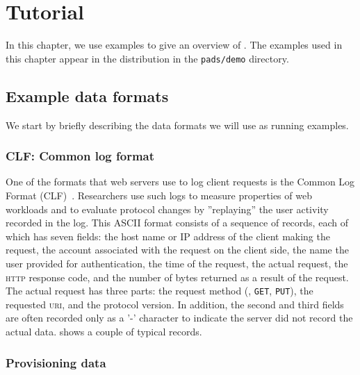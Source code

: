 \chapter{Tutorial}
\label{chap:example}
In this chapter, we use examples to give an overview of \pads{}.
The examples used in this chapter appear in the \pads{} distribution in the 
\texttt{pads/demo} directory.


\section{Example data formats}
We start by briefly describing the data formats we will use as running examples. 

\subsection{CLF: Common log format}
\label{sec:example:common-log-format}
One of the formats that web servers use to log client
requests is the Common Log Format (CLF)~\cite{wpp}.  Researchers use such logs to measure 
properties of web workloads and to evaluate protocol changes
by ''replaying'' the user activity recorded in the log.
This ASCII format consists of a sequence of
records, each of which has seven fields: the host name or IP address
of the client making the request, the account associated with the
request on the client side, the name the user provided for
authentication, the time of the request, the actual request, the
\textsc{http} response code, and the number of bytes returned as a
result of the request.  The actual request has three parts: the
request method (\eg, \texttt{GET}, \texttt{PUT}), the requested
\textsc{uri}, and the protocol version.  In addition, the second and
third fields are often recorded only as a '-' character to indicate
the server did not record the actual data.  
shows a couple of typical records.

\subsection{Provisioning data}

